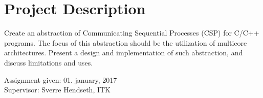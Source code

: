 \setcounter{page}{0}
\newpage
{}
\section*{Project Description}
\label{sec:project_description}

Create an abstraction of Communicating Sequential Processes (CSP) for C/C++ programs. The focus of this abstraction should be the utilization of multicore architectures. Present a design and implementation of such abstraction, and discuss limitations and uses.

\begin{flushleft}
Assignment given: 01. january, 2017\\
Supervisor: Sverre Hendseth, ITK
\end{flushleft}


\afterpage{\blankpage}
